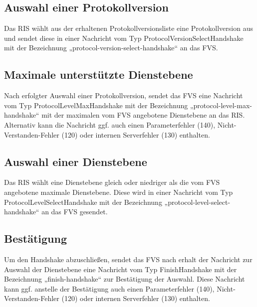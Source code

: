 

\subsection{Auswahl einer Protokollversion}
Das RIS wählt aus der erhaltenen Protokollversionsliste eine Protokollversion aus und sendet diese in einer Nachricht vom Typ ProtocolVersionSelectHandshake mit der Bezeichnung „protocol-version-select-handshake“ an das FVS.



\subsection{Maximale unterstützte Dienstebene}
Nach erfolgter Auswahl einer Protokollversion, sendet das FVS eine Nachricht vom Typ ProtocolLevelMaxHandshake mit der Bezeichnung „protocol-level-max-handshake“ mit der maximalen vom FVS angebotene Dienstebene an das RIS. Alternativ kann die Nachricht ggf. auch einen Parameterfehler (140), Nicht-Verstanden-Fehler (120) oder internen Serverfehler (130) enthalten.



\subsection{Auswahl einer Dienstebene}
Das RIS wählt eine Dienstebene gleich oder niedriger als die vom FVS angebotene maximale Dienstebene. Diese wird in einer Nachricht vom Typ ProtocolLevelSelectHandshake mit der Bezeichnung „protocol-level-select-handshake“ an das FVS gesendet.



\subsection{Bestätigung}
Um den Handshake abzuschließen, sendet das FVS nach erhalt der Nachricht zur Auswahl der Dienstebene eine Nachricht vom Typ FinishHandshake mit der Bezeichnung „finish-handshake“ zur Bestätigung der Auswahl. Diese Nachricht kann ggf. anstelle der Bestätigung auch einen Parameterfehler (140), Nicht-Verstanden-Fehler (120) oder internen Serverfehler (130) enthalten. 



